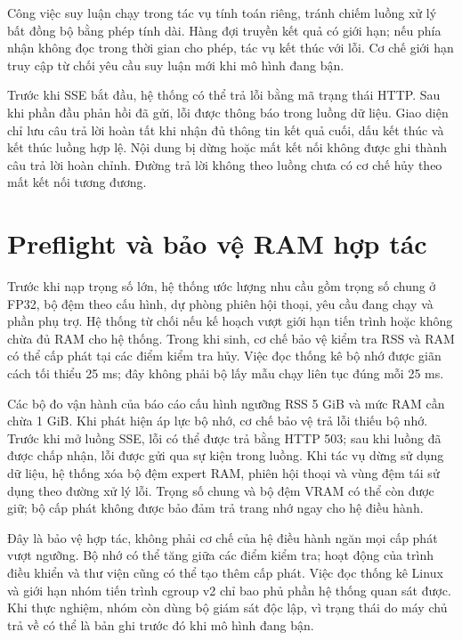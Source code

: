 Công việc suy luận chạy trong tác vụ tính toán riêng, tránh chiếm luồng xử lý bất đồng bộ bằng phép tính dài. Hàng đợi truyền kết quả có giới hạn; nếu phía nhận không đọc trong thời gian cho phép, tác vụ kết thúc với lỗi. Cơ chế giới hạn truy cập từ chối yêu cầu suy luận mới khi mô hình đang bận.

Trước khi SSE bắt đầu, hệ thống có thể trả lỗi bằng mã trạng thái HTTP. Sau khi phần đầu phản hồi đã gửi, lỗi được thông báo trong luồng dữ liệu. Giao diện chỉ lưu câu trả lời hoàn tất khi nhận đủ thông tin kết quả cuối, dấu kết thúc và kết thúc luồng hợp lệ. Nội dung bị dừng hoặc mất kết nối không được ghi thành câu trả lời hoàn chỉnh. Đường trả lời không theo luồng chưa có cơ chế hủy theo mất kết nối tương đương.

\section{Preflight và bảo vệ RAM hợp tác}

Trước khi nạp trọng số lớn, hệ thống ước lượng nhu cầu gồm trọng số chung ở FP32, bộ đệm theo cấu hình, dự phòng phiên hội thoại, yêu cầu đang chạy và phần phụ trợ. Hệ thống từ chối nếu kế hoạch vượt giới hạn tiến trình hoặc không chừa đủ RAM cho hệ thống. Trong khi sinh, cơ chế bảo vệ kiểm tra RSS và RAM có thể cấp phát tại các điểm kiểm tra hủy. Việc đọc thống kê bộ nhớ được giãn cách tối thiểu 25 ms; đây không phải bộ lấy mẫu chạy liên tục đúng mỗi 25 ms.

Các bộ đo vận hành của báo cáo cấu hình ngưỡng RSS 5 GiB và mức RAM cần chừa 1 GiB. Khi phát hiện áp lực bộ nhớ, cơ chế bảo vệ trả lỗi thiếu bộ nhớ. Trước khi mở luồng SSE, lỗi có thể được trả bằng HTTP 503; sau khi luồng đã được chấp nhận, lỗi được gửi qua sự kiện trong luồng. Khi tác vụ dừng sử dụng dữ liệu, hệ thống xóa bộ đệm expert RAM, phiên hội thoại và vùng đệm tái sử dụng theo đường xử lý lỗi. Trọng số chung và bộ đệm VRAM có thể còn được giữ; bộ cấp phát không được bảo đảm trả trang nhớ ngay cho hệ điều hành.

Đây là bảo vệ hợp tác, không phải cơ chế của hệ điều hành ngăn mọi cấp phát vượt ngưỡng. Bộ nhớ có thể tăng giữa các điểm kiểm tra; hoạt động của trình điều khiển và thư viện cũng có thể tạo thêm cấp phát. Việc đọc thống kê Linux và giới hạn nhóm tiến trình cgroup v2 chỉ bao phủ phần hệ thống quan sát được. Khi thực nghiệm, nhóm còn dùng bộ giám sát độc lập, vì trạng thái do máy chủ trả về có thể là bản ghi trước đó khi mô hình đang bận.